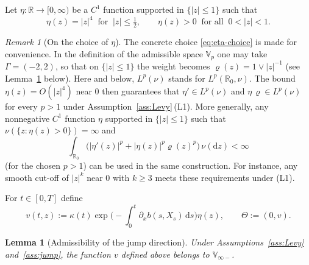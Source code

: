 \documentclass[11pt]{article}
\newcommand{\R}{\mathbb{R}}
\newcommand{\Vb}{\mathbb{V}}
\newcommand{\1}{\mathbf{1}}
\newcommand{\dd}{\mathrm{d}}
\theoremstyle{plain}
\newtheorem{lemma}[theorem]{Lemma}
\theoremstyle{definition}
\theoremstyle{remark}
\newtheorem{remark}[theorem]{Remark}
\begin{document}
Let $\eta:\R\to[0,\infty)$ be a $C^1$ function supported in $\{|z|\le 1\}$ such that
\begin{equation}\label{eq:eta-choice}
\eta(z)=|z|^4\ \text{ for }\ |z|\le \tfrac12,\qquad \eta(z)>0\ \text{ for all }\ 0<|z|<1.
\end{equation}

\begin{remark}[On the choice of $\eta$]
The concrete choice \eqref{eq:eta-choice} is made for convenience.
In the definition of the admissible space $\Vb_p$ one may take $\Gamma=(-2,2)$, so that on $\{|z|\le 1\}$ the weight becomes
$\varrho(z)=1\vee |z|^{-1}$ (see Lemma~\ref{lem:v-admissible} below).
Here and below, $L^p(\nu)$ stands for $L^p(\R_0,\nu)$. The bound $\eta(z)=O(|z|^4)$ near $0$ then guarantees that $\eta'\in L^p(\nu)$ and $\eta\,\varrho\in L^p(\nu)$ for every $p>1$
under Assumption~\ref{ass:Levy}\,(L1).
More generally, any nonnegative $C^1$ function $\eta$ supported in $\{|z|\le 1\}$ such that
$\nu(\{z:\eta(z)>0\})=\infty$ and
\[
\int_{\R_0}\big(|\eta'(z)|^p+|\eta(z)|^p\varrho(z)^p\big)\,\nu(\dd z)<\infty
\]
(for the chosen $p>1$) can be used in the same construction.
For instance, any smooth cut-off of $|z|^k$ near $0$ with $k\ge 3$ meets these requirements under (L1).
\end{remark}

For $t\in[0,T]$ define
\[
v(t,z):=\kappa(t)\exp\Big(-\int_0^t \partial_x b(s,X_s)\,\dd s\Big)\eta(z),
\qquad \Theta:=(0,v).
\]
\begin{lemma}[Admissibility of the jump direction]\label{lem:v-admissible}
Under Assumptions~\ref{ass:Levy} and~\ref{ass:jump}, the function $v$ defined above belongs to $\Vb_{\infty-}$.
\end{lemma}
\end{document}
